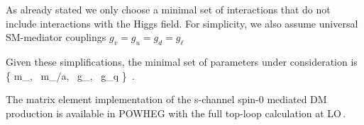 As already stated we only choose a minimal set of interactions that do not include interactions with the Higgs field. For simplicity, we also assume universal SM-mediator couplings $g_v = g_u = g_d = g_\ell$

Given these simplifications, the minimal set of parameters under consideration is
 \bea
  \left\{ m_\chi,~ m_{\phi/a},~ g_\chi,~ g_q \right\} \,.
 \eea


The matrix element implementation of the s-channel spin-0 mediated DM production is available in POWHEG with the full top-loop calculation at LO\,\cite{Haisch:2015ioa}.


